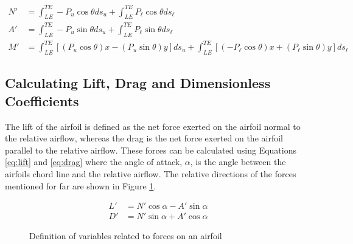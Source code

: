 \documentclass[runningheads]{llncs}
\begin{document}
\begin{align}
    N' &= \int_{LE}^{TE} -P_u\cos\theta ds_u + \int_{LE}^{TE} P_\ell\cos\theta ds_\ell
    \label{eq:normal_force}\\
    A' &= \int_{LE}^{TE} -P_u\sin\theta ds_u + \int_{LE}^{TE} P_\ell\sin\theta ds_\ell
    \label{eq:axial_force}\\
    M' &= \int_{LE}^{TE} \left[(P_u\cos\theta)x - (P_u\sin\theta)y\right]ds_u + \int_{LE}^{TE} \left[(-P_\ell\cos\theta)x + (P_\ell\sin\theta)y\right]ds_\ell
    \label{eq:leading_edge_moment}
\end{align}

\subsection{Calculating Lift, Drag and Dimensionless Coefficients}

\noindent
The lift of the airfoil is defined as the net force exerted on the airfoil normal to the relative airflow, whereas the drag is the net force exerted on the airfoil parallel to the relative airflow. These forces can be calculated using Equations \ref{eq:lift} and \ref{eq:drag} where the angle of attack, $\alpha$, is the angle between the airfoils chord line and the relative airflow. The relative directions of the forces mentioned for far are shown in Figure \ref{fig:airfoil_directions}.\newline

\begin{align}
    L' &= N'\cos\alpha - A'\sin\alpha \label{eq:lift} \\
    D' &= N'\sin\alpha + A'\cos\alpha \label{eq:drag}
\end{align}

\begin{figure}
    \centering
    \caption{Definition of variables related to forces on an airfoil}
    \label{fig:airfoil_directions}
\end{figure}
\end{document}
